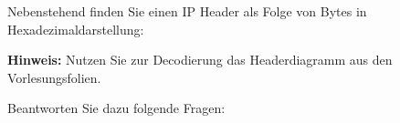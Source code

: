 \question

\begin{minipage}{.45\linewidth}
Nebenstehend finden Sie einen IP Header
als Folge von Bytes in Hexadezimaldarstellung:

\textbf{Hinweis:} Nutzen Sie zur Decodierung das Headerdiagramm aus den Vorlesungsfolien.
\end{minipage}
\hfill
\begin{minipage}{.45\linewidth}
	
\end{minipage}

Beantworten Sie dazu folgende Fragen:
\setlength\answerskip{\dimexpr-\baselineskip}
\begin{parts}
	
\end{parts}
